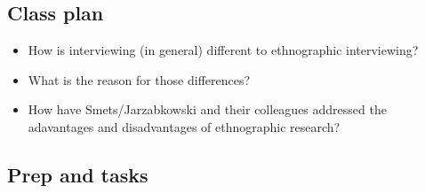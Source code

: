 \documentclass[]{book}
\theoremstyle{definition}
\theoremstyle{definition}
\theoremstyle{definition}
\theoremstyle{remark}
\begin{document}
\hypertarget{class-plan-6}{%
\subsection*{Class plan}\label{class-plan-6}}

\begin{itemize}
\item
  How is interviewing (in general) different to ethnographic
  interviewing?
\item
  What is the reason for those differences?
\item
  How have Smets/Jarzabkowski and their colleagues addressed the
  adavantages and disadvantages of ethnographic research?
\end{itemize}

\hypertarget{prep-and-tasks-6}{%
\subsection*{Prep and tasks}\label{prep-and-tasks-6}}
\end{document}
